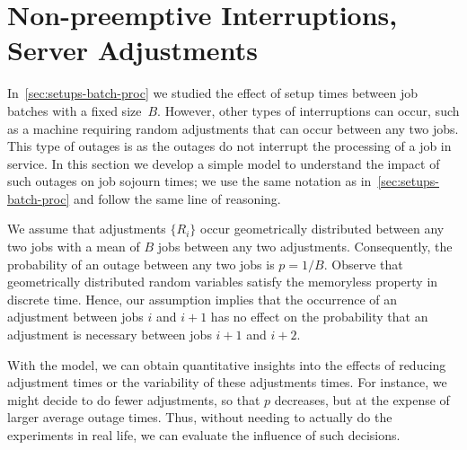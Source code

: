 \section{Non-preemptive Interruptions, Server Adjustments}
\label{sec:non-preempt-interr}





In~\cref{sec:setups-batch-proc} we studied the effect of setup times between job batches with a fixed size~$B$.
However, other types of interruptions can occur, such as a machine requiring random adjustments that can occur between any two jobs.
This type of outages is  as the outages do not interrupt the processing of a job in service.
In this section we develop a simple model to understand the impact of such outages on job sojourn times; we use the same notation as in~\cref{sec:setups-batch-proc} and follow the same line of reasoning.

We assume that adjustments $\{R_i\}$ occur geometrically distributed between any two jobs with a mean of $B$ jobs between any two adjustments.
Consequently, the probability of an outage between any two jobs is $p=1/B$.
Observe that geometrically distributed random variables satisfy the memoryless property in discrete time.
Hence, our assumption implies that the occurrence of an adjustment between jobs $i$ and $i+1$ has no effect on the probability that an adjustment is necessary between jobs $i+1$ and $i+2$.

With the model, we can obtain quantitative insights into the effects of reducing adjustment times or the variability of these adjustments times.
For instance, we might decide to do fewer adjustments, so that $p$ decreases, but at the expense of larger average outage times.
Thus, without needing to actually do the experiments in real life, we can evaluate the influence of such decisions.

